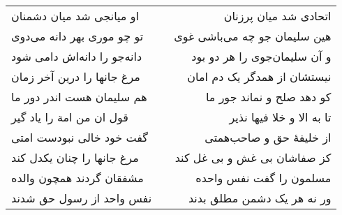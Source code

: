 \begin{center}
\begin{longtable}{l p{0.5cm} r}
او میانجی شد میان دشمنان
&&
اتحادی شد میان پرزنان
\\
تو چو موری بهر دانه می‌دوی
&&
هین سلیمان جو چه می‌باشی غوی
\\
دانه‌جو را دانه‌اش دامی شود
&&
و آن سلیمان‌جوی را هر دو بود
\\
مرغ جانها را درین آخر زمان
&&
نیستشان از همدگر یک دم امان
\\
هم سلیمان هست اندر دور ما
&&
کو دهد صلح و نماند جور ما
\\
قول ان من امة را یاد گیر
&&
تا به الا و خلا فیها نذیر
\\
گفت خود خالی نبودست امتی
&&
از خلیفهٔ حق و صاحب‌همتی
\\
مرغ جانها را چنان یکدل کند
&&
کز صفاشان بی غش و بی غل کند
\\
مشفقان گردند همچون والده
&&
مسلمون را گفت نفس واحده
\\
نفس واحد از رسول حق شدند
&&
ور نه هر یک دشمن مطلق بدند
\\
\end{longtable}
\end{center}
